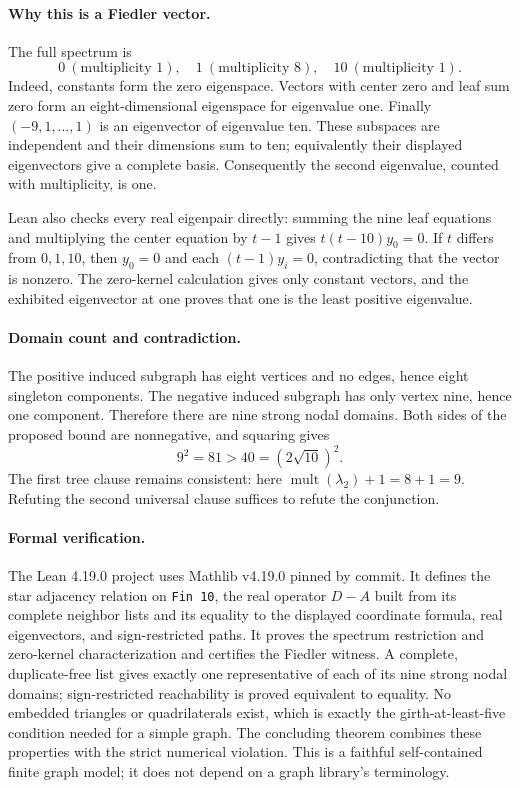 \documentclass[11pt]{article}
\begin{document}
\paragraph{Why this is a Fiedler vector.} The full spectrum is
\[
0\ (\text{multiplicity }1),\quad1\ (\text{multiplicity }8),\quad10\ (\text{multiplicity }1).
\]
Indeed, constants form the zero eigenspace. Vectors with center zero and leaf sum zero form an eight-dimensional eigenspace for eigenvalue one. Finally $(-9,1,\ldots,1)$ is an eigenvector of eigenvalue ten. These subspaces are independent and their dimensions sum to ten; equivalently their displayed eigenvectors give a complete basis. Consequently the second eigenvalue, counted with multiplicity, is one.

Lean also checks every real eigenpair directly: summing the nine leaf equations and multiplying the center equation by $t-1$ gives $t(t-10)y_0=0$. If $t$ differs from $0,1,10$, then $y_0=0$ and each $(t-1)y_i=0$, contradicting that the vector is nonzero. The zero-kernel calculation gives only constant vectors, and the exhibited eigenvector at one proves that one is the least positive eigenvalue.

\paragraph{Domain count and contradiction.} The positive induced subgraph has eight vertices and no edges, hence eight singleton components. The negative induced subgraph has only vertex nine, hence one component. Therefore there are nine strong nodal domains. Both sides of the proposed bound are nonnegative, and squaring gives
\[
9^2=81>40=(2\sqrt{10})^2.
\]
The first tree clause remains consistent: here $\operatorname{mult}(\lambda_2)+1=8+1=9$. Refuting the second universal clause suffices to refute the conjunction.

\paragraph{Formal verification.} The Lean 4.19.0 project uses Mathlib v4.19.0 pinned by commit. It defines the star adjacency relation on \texttt{Fin 10}, the real operator $D-A$ built from its complete neighbor lists and its equality to the displayed coordinate formula, real eigenvectors, and sign-restricted paths. It proves the spectrum restriction and zero-kernel characterization and certifies the Fiedler witness. A complete, duplicate-free list gives exactly one representative of each of its nine strong nodal domains; sign-restricted reachability is proved equivalent to equality. No embedded triangles or quadrilaterals exist, which is exactly the girth-at-least-five condition needed for a simple graph. The concluding theorem combines these properties with the strict numerical violation. This is a faithful self-contained finite graph model; it does not depend on a graph library's terminology.
\end{document}
